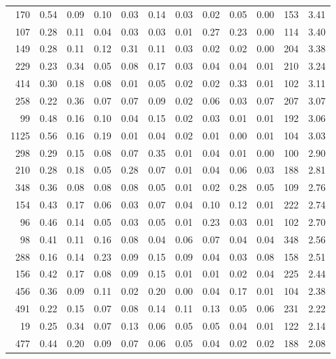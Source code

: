 \begin{tabular}{rrrrrrrrrrll}
          170 & 0.54 & 0.09 & 0.10 & 0.03 & 0.14 & 0.03 & 0.02 & 0.05 & 0.00 & 153 &  3.41 \\
          107 & 0.28 & 0.11 & 0.04 & 0.03 & 0.03 & 0.01 & 0.27 & 0.23 & 0.00 & 114 &  3.40 \\
          149 & 0.28 & 0.11 & 0.12 & 0.31 & 0.11 & 0.03 & 0.02 & 0.02 & 0.00 & 204 &  3.38 \\
          229 & 0.23 & 0.34 & 0.05 & 0.08 & 0.17 & 0.03 & 0.04 & 0.04 & 0.01 & 210 &  3.24 \\
          414 & 0.30 & 0.18 & 0.08 & 0.01 & 0.05 & 0.02 & 0.02 & 0.33 & 0.01 & 102 &  3.11 \\
          258 & 0.22 & 0.36 & 0.07 & 0.07 & 0.09 & 0.02 & 0.06 & 0.03 & 0.07 & 207 &  3.07 \\
           99 & 0.48 & 0.16 & 0.10 & 0.04 & 0.15 & 0.02 & 0.03 & 0.01 & 0.01 & 192 &  3.06 \\
         1125 & 0.56 & 0.16 & 0.19 & 0.01 & 0.04 & 0.02 & 0.01 & 0.00 & 0.01 & 104 &  3.03 \\
          298 & 0.29 & 0.15 & 0.08 & 0.07 & 0.35 & 0.01 & 0.04 & 0.01 & 0.00 & 100 &  2.90 \\
          210 & 0.28 & 0.18 & 0.05 & 0.28 & 0.07 & 0.01 & 0.04 & 0.06 & 0.03 & 188 &  2.81 \\
          348 & 0.36 & 0.08 & 0.08 & 0.08 & 0.05 & 0.01 & 0.02 & 0.28 & 0.05 & 109 &  2.76 \\
          154 & 0.43 & 0.17 & 0.06 & 0.03 & 0.07 & 0.04 & 0.10 & 0.12 & 0.01 & 222 &  2.74 \\
           96 & 0.46 & 0.14 & 0.05 & 0.03 & 0.05 & 0.01 & 0.23 & 0.03 & 0.01 & 102 &  2.70 \\
           98 & 0.41 & 0.11 & 0.16 & 0.08 & 0.04 & 0.06 & 0.07 & 0.04 & 0.04 & 348 &  2.56 \\
          288 & 0.16 & 0.14 & 0.23 & 0.09 & 0.15 & 0.09 & 0.04 & 0.03 & 0.08 & 158 &  2.51 \\
          156 & 0.42 & 0.17 & 0.08 & 0.09 & 0.15 & 0.01 & 0.01 & 0.02 & 0.04 & 225 &  2.44 \\
          456 & 0.36 & 0.09 & 0.11 & 0.02 & 0.20 & 0.00 & 0.04 & 0.17 & 0.01 & 104 &  2.38 \\
          491 & 0.22 & 0.15 & 0.07 & 0.08 & 0.14 & 0.11 & 0.13 & 0.05 & 0.06 & 231 &  2.22 \\
           19 & 0.25 & 0.34 & 0.07 & 0.13 & 0.06 & 0.05 & 0.05 & 0.04 & 0.01 & 122 &  2.14 \\
          477 & 0.44 & 0.20 & 0.09 & 0.07 & 0.06 & 0.05 & 0.04 & 0.02 & 0.02 & 188 &  2.08 \\

\end{tabular}
